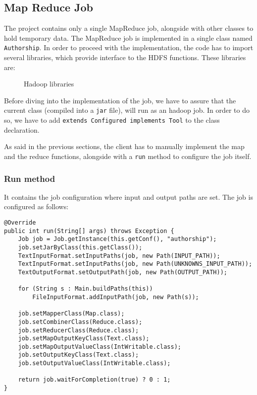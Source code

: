 \documentclass[a4paper,11pt, twoside]{article}
\begin{document}
	\subsection{Map Reduce Job}
		The project contains only a single MapReduce job, alongside with other classes to hold temporary data. The MapReduce job is implemented in a single class named \lstinline|Authorship|. In order to proceed with the implementation, the code has to import several libraries, which provide interface to the HDFS functions. These libraries are:
		\begin{figure}[H]
			{\small
			}
			\caption{Hadoop libraries}
    		\label{fig:hadoop-libs}
		\end{figure}

		\noindent
		Before diving into the implementation of the job, we have to assure that the current class (compiled into a \verb|jar| file), will run as an hadoop job. In order to do so, we have to add \lstinline|extends Configured implements Tool| to the class declaration.
		
		\bigskip
		\noindent
		As said in the previous sections, the client has to manually implement the map and the reduce functions, alongside with a \lstinline|run| method to configure the job itself.

	\subsubsection{Run method}
		It contains the job configuration where input and output paths are set.
		The job is configured as follows:
	
	\begin{lstlisting}[firstnumber=48, caption={Run method}, captionpos=b]
@Override
public int run(String[] args) throws Exception {
	Job job = Job.getInstance(this.getConf(), "authorship");
	job.setJarByClass(this.getClass());
	TextInputFormat.setInputPaths(job, new Path(INPUT_PATH));
	TextInputFormat.setInputPaths(job, new Path(UNKNOWNS_INPUT_PATH));
	TextOutputFormat.setOutputPath(job, new Path(OUTPUT_PATH));
	
	for (String s : Main.buildPaths(this))
		FileInputFormat.addInputPath(job, new Path(s));
	
	job.setMapperClass(Map.class);
	job.setCombinerClass(Reduce.class);
	job.setReducerClass(Reduce.class);
	job.setMapOutputKeyClass(Text.class);
	job.setMapOutputValueClass(IntWritable.class);
	job.setOutputKeyClass(Text.class);
	job.setOutputValueClass(IntWritable.class);
	
	return job.waitForCompletion(true) ? 0 : 1;
}
	\end{lstlisting}
	
\end{document}
